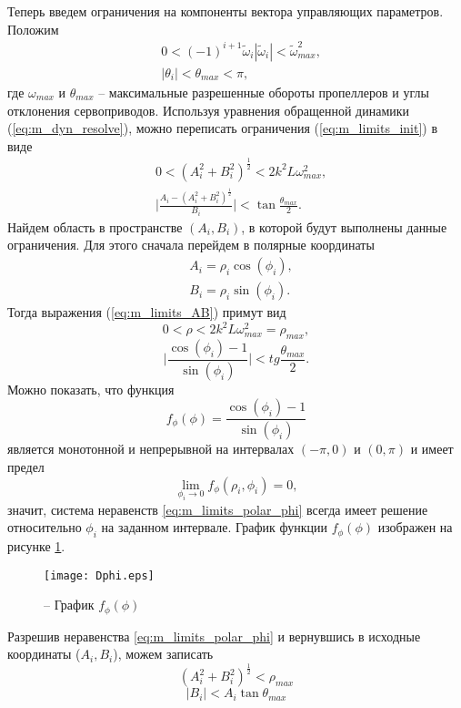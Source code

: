 Теперь введем ограничения на компоненты вектора управляющих параметров.
Положим 
\begin{equation} \label{eq:m_limits_init}
\begin{aligned}
&0< (-1)^{i+1} \tilde \omega_i |\tilde\omega_i| < \tilde \omega_{max}^2,
\\
&|\theta_i| < \theta_{max} < \pi,
\end{aligned}
\end{equation}
где $\omega_{max}$ и $\theta_{max}$ -- максимальные разрешенные обороты пропеллеров и углы отклонения сервоприводов.
Используя уравнения обращенной динамики (\ref{eq:m_dyn_resolve}), можно переписать ограничения (\ref{eq:m_limits_init}) в виде
\begin{equation} \label{eq:m_limits_AB}
\begin{aligned}
&0 <
(A^2_i +  B^2_i)^{\frac{1}{2}}
< 2 k^2 L\omega_{max}^2,
\\
&\Bigg|\frac{A_i-(A^2_i +  B^2_i)^{\frac{1}{2}}}{B_i}\Bigg| < 
\tan\frac{\theta_{max}}{2}.
\end{aligned}
\end{equation}
Найдем область в пространстве $(A_i, B_i)$, в которой будут выполнены данные ограничения. Для этого сначала перейдем в полярные координаты
\begin{equation} \label{eq:m_polar}
\begin{aligned}
&A_i = \rho_i \cos(\phi_i),
\\
&B_i = \rho_i \sin(\phi_i).
\end{aligned}
\end{equation}
Тогда выражения (\ref{eq:m_limits_AB}) примут вид
\begin{equation} \label{eq:m_limits_polar_rho}
0 < \rho < 
2 k^2 L\omega_{max}^2
= \rho_{max},
\end{equation}
\begin{equation} \label{eq:m_limits_polar_phi}
\Bigg| \frac{\cos(\phi_i)-1}{\sin(\phi_i)} \Bigg| < 
tg\frac{\theta_{max}}{2}.
\end{equation}
Можно показать, что функция
$$f_{\phi}(\phi) = \frac{\cos(\phi_i)-1}{\sin(\phi_i)}$$
является монотонной и непрерывной на интервалах
$(-{\pi}, 0)$
и
$( 0, \pi)$
и имеет предел
$$\lim_{\phi_i \to 0}
f_{\phi}(\rho_i, \phi_i) = 0,$$
значит, система неравенств
\eqref{eq:m_limits_polar_phi}
всегда имеет решение относительно $\phi_i$ на заданном интервале. График функции $f_{\phi}(\phi)$ изображен на рисунке \ref{fig:f_phi}.
\begin{figure}[h!]
	\centering
	\texttt{[image: Dphi.eps]}
	\caption{ -- График $f_{\phi}(\phi)$}
	\label{fig:f_phi}
\end{figure}
Разрешив неравенства \eqref{eq:m_limits_polar_phi} и вернувшись в исходные координаты ($A_i, B_i$), можем записать
\begin{equation} \label{eq:m_limits_new_1}
(A^2_i +  B^2_i)^{\frac{1}{2}} <
\rho_{max}
\end{equation}
\begin{equation} \label{eq:m_limits_new_2}
|B_i| < A_i \tan \theta_{max}
\end{equation}

